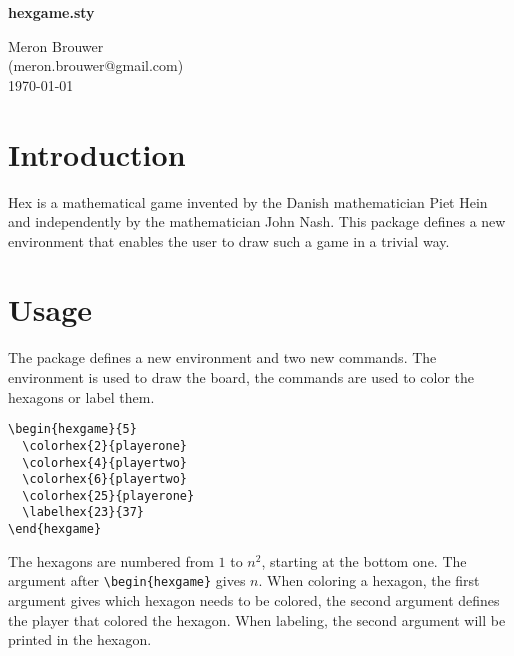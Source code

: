 \documentclass{article}
\begin{document}
\begin{center}
	\textbf{\Huge hexgame.sty} 

	Meron Brouwer \\
	(meron.brouwer@gmail.com)\\
	\today
\end{center}

\section{Introduction}
Hex is a mathematical game invented by the Danish mathematician Piet Hein and independently by the mathematician John Nash. This package defines a new
environment that enables the user to draw such a game in a trivial way. 

\section{Usage}
The package defines a new environment and two new commands. The environment is used to draw the board, the commands are used to color the hexagons or label them.

	\begin{minipage}{80mm}
		\verb+\begin{hexgame}{5}+ \\
		\verb+	\colorhex{2}{playerone}+ \\
		\verb+	\colorhex{4}{playertwo}+ \\
		\verb+	\colorhex{6}{playertwo}+ \\
		\verb+	\colorhex{25}{playerone}+ \\
		\verb+  \labelhex{23}{37}+\\
		\verb+\end{hexgame}+
	\end{minipage} 
	\begin{minipage}{85mm}
	\begin{hexgame}{5}
	\end{hexgame}
	\end{minipage}

The hexagons are numbered from $1$ to $n^2$, starting at the bottom one. The argument after \verb+\begin{hexgame}+ gives $n$. When coloring a hexagon, the first argument gives which hexagon needs to be colored, the second argument defines the player that colored the hexagon. When labeling, the second argument will be printed in the hexagon.
\end{document}
